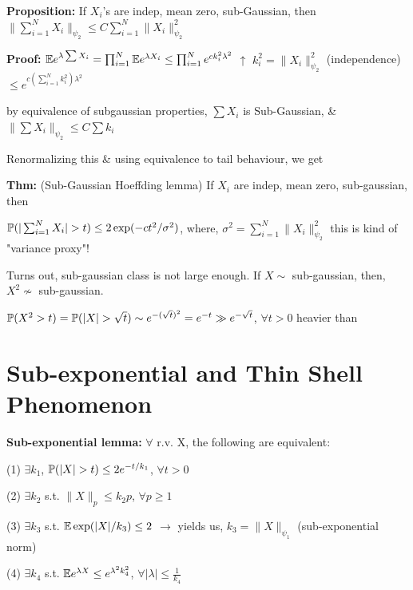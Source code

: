 \documentclass[12pt]{article}
\begin{document}
\textbf{Proposition:} If $X_i$'s are indep, mean zero, sub-Gaussian, then $\|\sum_{i=1}^N X_i\|_{\psi_2} \leq C \sum_{i=1}^N \|X_i\|_{\psi_2}^2$

\textbf{Proof:} $\mathbb{E} e^{\lambda \sum X_i} = \prod_{i=1}^N \mathbb{E} e^{\lambda X_i} \leq \prod_{i=1}^N e^{ck_i^2 \lambda^2}$
\hspace*{4cm} $\uparrow$ \hspace*{2cm} $k_i^2 = \|X_i\|_{\psi_2}^2$
\hspace*{3cm} (independence)
\hspace*{4cm} $\leq e^{c(\sum_{i=1}^N k_i^2) \lambda^2}$

by equivalence of subgaussian properties, $\sum X_i$ is Sub-Gaussian, \& $\|\sum X_i\|_{\psi_2} \leq C \sum k_i$

Renormalizing this \& using equivalence to tail behaviour, we get

\textbf{Thm:} (Sub-Gaussian Hoeffding lemma) If $X_i$ are indep, mean zero, sub-gaussian, then

$\mathbb{P}(|\sum_{i=1}^N X_i| > t) \leq 2 \exp(-ct^2/\sigma^2)$, where, $\sigma^2 = \sum_{i=1}^N \|X_i\|_{\psi_2}^2$
\hspace*{8cm} this is kind of "variance
\hspace*{8cm} proxy"!

Turns out, sub-gaussian class is not large enough.
If $X \sim$ sub-gaussian, then, $X^2 \not\sim$ sub-gaussian.

$\mathbb{P}(X^2 > t) = \mathbb{P}(|X| > \sqrt{t}) \sim e^{-(\sqrt{t})^2} = e^{-t} \gg e^{-\sqrt{t}}$, $\forall t > 0$
\hspace*{7cm} heavier than

\section*{Sub-exponential and Thin Shell Phenomenon}

\textbf{Sub-exponential lemma:} $\forall$ r.v. X, the following are equivalent:

(1) $\exists k_1$, $\mathbb{P}(|X| > t) \leq 2e^{-t/k_1}$, $\forall t > 0$

(2) $\exists k_2$ s.t. $\|X\|_p \leq k_2 p$, $\forall p \geq 1$

(3) $\exists k_3$ s.t. $\mathbb{E} \exp(|X|/k_3) \leq 2$
\hspace*{4cm} $\longrightarrow$ yields us, $k_3 = \|X\|_{\psi_1}$
\hspace*{4cm} (sub-exponential norm)

(4) $\exists k_4$ s.t. $\mathbb{E} e^{\lambda X} \leq e^{\lambda^2 k_4^2}$, $\forall |\lambda| \leq \frac{1}{k_4}$
\end{document}
